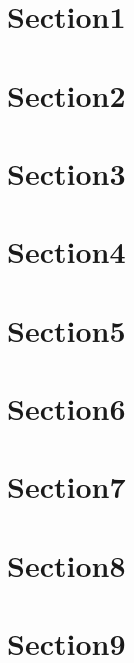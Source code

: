 \section{Section1}
\label{sec:}

\section{Section2}
\label{sec:}

\section{Section3}
\label{sec:}

\section{Section4}
\label{sec:}

\section{Section5}
\label{sec:}

\section{Section6}
\label{sec:}

\section{Section7}
\label{sec:}

\section{Section8}
\label{sec:}

\section{Section9}
\label{sec:}